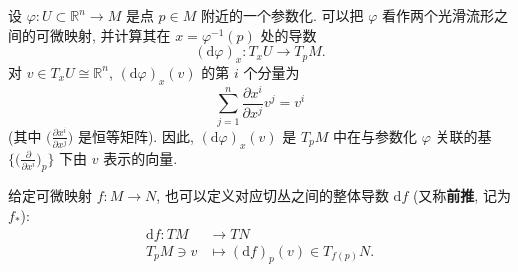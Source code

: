 \begin{RiemannExample}\label{ex:derivative-of-local-parametrization}
设 $\varphi:U\subset\mathbb{R}^n\to M$ 是点 $p\in M$ 附近的一个参数化. 可以把 $\varphi$ 看作两个光滑流形之间的可微映射, 并计算其在 $x=\varphi^{-1}(p)$ 处的导数
\[
  (\mathrm{d}\varphi)_x:T_xU\to T_pM.
\]
对 $v\in T_xU\cong\mathbb{R}^n$, $(\mathrm{d}\varphi)_x(v)$ 的第 $i$ 个分量为
\[
  \sum_{j=1}^n\frac{\partial x^i}{\partial x^j}v^j=v^i
\]
(其中 $\bigl(\frac{\partial x^i}{\partial x^j}\bigr)$ 是恒等矩阵). 因此, $(\mathrm{d}\varphi)_x(v)$ 是 $T_pM$ 中在与参数化 $\varphi$ 关联的基 $\bigl\{\bigl(\frac{\partial}{\partial x^i}\bigr)_p\bigr\}$ 下由 $v$ 表示的向量.
\end{RiemannExample}

给定可微映射 $f:M\to N$, 也可以定义对应切丛之间的整体导数 $\mathrm{d}f$ (又称\textbf{前推}, 记为 $f_*$):
\begin{align*}
  \mathrm{d}f:TM&\to TN\\
  T_pM\ni v&\mapsto(\mathrm{d}f)_p(v)\in T_{f(p)}N.
\end{align*}

